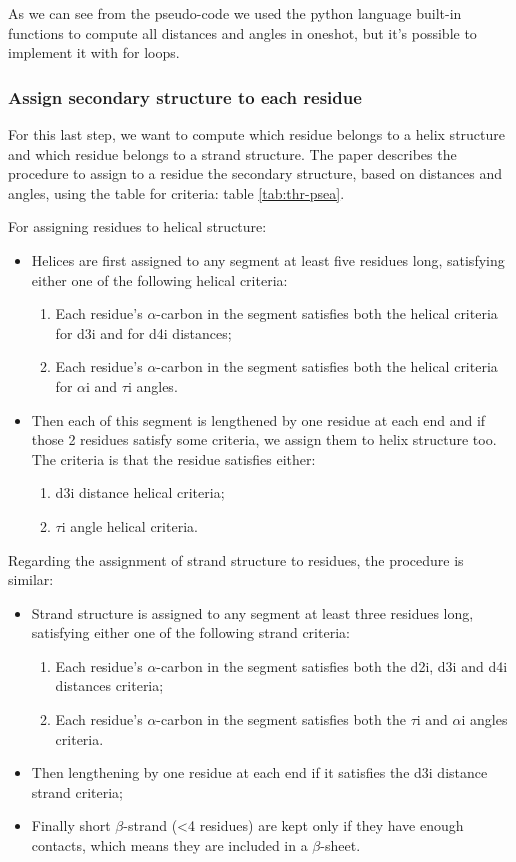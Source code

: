 As we can see from the pseudo-code we used the python language built-in functions to compute all distances and angles in oneshot, but it's possible to implement it with for loops.

\subsubsection{Assign secondary structure to each residue}
For this last step, we want to compute which residue belongs to a helix structure and which residue belongs to a strand structure.
The paper describes the procedure to assign to a residue the secondary structure, based on distances and angles, using the table for criteria: table \ref{tab:thr-psea}.

For assigning residues to helical structure:
\begin{itemize}
    \item Helices are first assigned to any segment at least five residues long, satisfying either one of the following helical criteria:
        \begin{enumerate}
            \item Each residue's $\alpha$-carbon in the segment satisfies both the helical criteria for d3i and for d4i distances;
            \item Each residue's $\alpha$-carbon in the segment satisfies both the helical criteria for $\alpha$i and $\tau$i angles.
        \end{enumerate}
    \item Then each of this segment is lengthened by one residue at each end and if those 2 residues satisfy some criteria, we assign them to helix structure too. The criteria is that the residue satisfies either:
    \begin{enumerate}
        \item d3i distance helical criteria;
        \item $\tau$i angle helical criteria.
    \end{enumerate}
\end{itemize} 
Regarding the assignment of strand structure to residues, the procedure is similar:
\begin{itemize}
    \item Strand structure is assigned to any segment at least three residues long, satisfying either one of the following strand criteria:
    \begin{enumerate}
        \item Each residue's $\alpha$-carbon in the segment satisfies both the d2i, d3i and d4i distances criteria; 
        \item Each residue's $\alpha$-carbon in the segment satisfies both the $\tau$i and $\alpha$i angles criteria.
    \end{enumerate}
    \item Then lengthening by one residue at each end if it satisfies the d3i distance strand criteria;
    \item Finally short $\beta$-strand (<4 residues) are kept only if they have enough contacts, which means they are included in a $\beta$-sheet.
\end{itemize}

